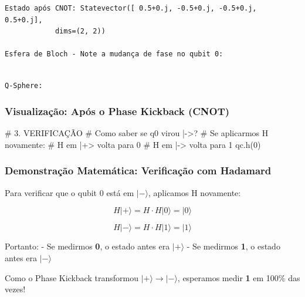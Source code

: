 \documentclass[
  brazilian,
]{report}
\newenvironment{Shaded}{\begin{snugshade}}{\end{snugshade}}
\newcommand{\NormalTok}[1]{\textcolor[rgb]{0.00,0.23,0.31}{#1}}
\begin{document}
\begin{verbatim}
Estado após CNOT: Statevector([ 0.5+0.j, -0.5+0.j, -0.5+0.j,  0.5+0.j],
            dims=(2, 2))

Esfera de Bloch - Note a mudança de fase no qubit 0:
\end{verbatim}

\begin{verbatim}

Q-Sphere:
\end{verbatim}

\subsubsection{Visualização: Após o Phase Kickback
(CNOT)}\label{visualizauxe7uxe3o-apuxf3s-o-phase-kickback-cnot}

\begin{Shaded}
\begin{Highlighting}[]


\NormalTok{\# 3. VERIFICAÇÃO}
\NormalTok{\# Como saber se q0 virou |{-}\textgreater{}?}
\NormalTok{\# Se aplicarmos H novamente:}
\NormalTok{\# H em |+\textgreater{} volta para 0}
\NormalTok{\# H em |{-}\textgreater{} volta para 1}
\NormalTok{qc.h(0)}
\end{Highlighting}
\end{Shaded}

\subsubsection{Demonstração Matemática: Verificação com
Hadamard}\label{demonstrauxe7uxe3o-matemuxe1tica-verificauxe7uxe3o-com-hadamard}

Para verificar que o qubit 0 está em \(|-\rangle\), aplicamos H
novamente:

\[H|+\rangle = H \cdot H|0\rangle = |0\rangle\]

\[H|-\rangle = H \cdot H|1\rangle = |1\rangle\]

Portanto: - Se medirmos \textbf{0}, o estado antes era \(|+\rangle\) -
Se medirmos \textbf{1}, o estado antes era \(|-\rangle\)

Como o Phase Kickback transformou \(|+\rangle \to |-\rangle\), esperamos
medir \textbf{1} em 100\% das vezes!
\end{document}
